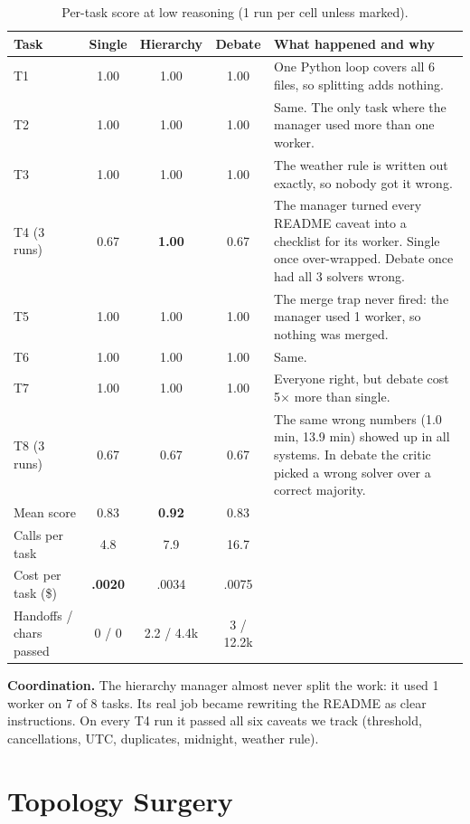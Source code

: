 \documentclass[10pt]{article}
\newcommand{\good}[1]{\textbf{#1}}
\begin{document}
\begin{table}[H]
\centering\small
\begin{tabularx}{\linewidth}{l ccc Y}
\toprule
Task & Single & Hierarchy & Debate & What happened and why \\
\midrule
T1 & 1.00 & 1.00 & 1.00 & One Python loop covers all 6 files, so splitting adds nothing. \\
T2 & 1.00 & 1.00 & 1.00 & Same. The only task where the manager used more than one worker. \\
T3 & 1.00 & 1.00 & 1.00 & The weather rule is written out exactly, so nobody got it wrong. \\
T4 (3 runs) & 0.67 & \good{1.00} & 0.67 & The manager turned every README caveat into a checklist for its worker. Single once over-wrapped. Debate once had all 3 solvers wrong. \\
T5 & 1.00 & 1.00 & 1.00 & The merge trap never fired: the manager used 1 worker, so nothing was merged. \\
T6 & 1.00 & 1.00 & 1.00 & Same. \\
T7 & 1.00 & 1.00 & 1.00 & Everyone right, but debate cost 5$\times$ more than single. \\
T8 (3 runs) & 0.67 & 0.67 & 0.67 & The same wrong numbers (1.0 min, 13.9 min) showed up in all systems. In debate the critic picked a wrong solver over a correct majority. \\
\midrule
Mean score & 0.83 & \good{0.92} & 0.83 & \\
Calls per task & 4.8 & 7.9 & 16.7 & \\
Cost per task (\$) & \good{.0020} & .0034 & .0075 & \\
Handoffs / chars passed & 0 / 0 & 2.2 / 4.4k & 3 / 12.2k & \\
\bottomrule
\end{tabularx}
\caption{Per-task score at low reasoning (1 run per cell unless marked).}
\end{table}

\textbf{Coordination.} The hierarchy manager almost never split the work: it used 1 worker on 7 of 8 tasks.
Its real job became rewriting the README as clear instructions. On every T4 run it passed all six caveats we
track (threshold, cancellations, UTC, duplicates, midnight, weather rule).

\section{Topology Surgery}
\end{document}

